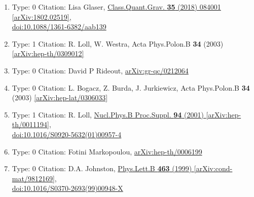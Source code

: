 \documentclass[a4paper,10pt]{article}
\begin{document}
\begin{enumerate}
\begin{enumerate}
  \item Type: 0 Citation: Lisa Glaser, \href{https://www.doi.org/10.1088/1361-6382/aab139}{Class.Quant.Grav. {\bf 35} (2018) 084001}  \href{https://arxiv.org/abs/1802.02519}{[arXiv:1802.02519]},\\\href{https://www.doi.org/10.1088/1361-6382/aab139}{doi:10.1088/1361-6382/aab139}
  \item Type: 1 Citation: R. Loll, W. Westra, Acta Phys.Polon.B {\bf 34} (2003)   \href{https://arxiv.org/abs/hep-th/0309012}{[arXiv:hep-th/0309012]}
  \item Type: 0 Citation: David P Rideout, \href{https://arxiv.org/abs/gr-qc/0212064}{arXiv:gr-qc/0212064}
  \item Type: 0 Citation: L. Bogacz, Z. Burda, J. Jurkiewicz, Acta Phys.Polon.B {\bf 34} (2003)   \href{https://arxiv.org/abs/hep-lat/0306033}{[arXiv:hep-lat/0306033]}
  \item Type: 1 Citation: R. Loll, \href{https://www.doi.org/10.1016/S0920-5632(01)00957-4}{Nucl.Phys.B Proc.Suppl. {\bf 94} (2001) }  \href{https://arxiv.org/abs/hep-th/0011194}{[arXiv:hep-th/0011194]},\\\href{https://www.doi.org/10.1016/S0920-5632(01)00957-4}{doi:10.1016/S0920-5632(01)00957-4}
  \item Type: 0 Citation: Fotini Markopoulou, \href{https://arxiv.org/abs/hep-th/0006199}{arXiv:hep-th/0006199}
  \item Type: 0 Citation: D.A. Johnston, \href{https://www.doi.org/10.1016/S0370-2693(99)00948-X}{Phys.Lett.B {\bf 463} (1999) }  \href{https://arxiv.org/abs/cond-mat/9812169}{[arXiv:cond-mat/9812169]},\\\href{https://www.doi.org/10.1016/S0370-2693(99)00948-X}{doi:10.1016/S0370-2693(99)00948-X}

\end{enumerate}
\end{enumerate}
\end{document}
